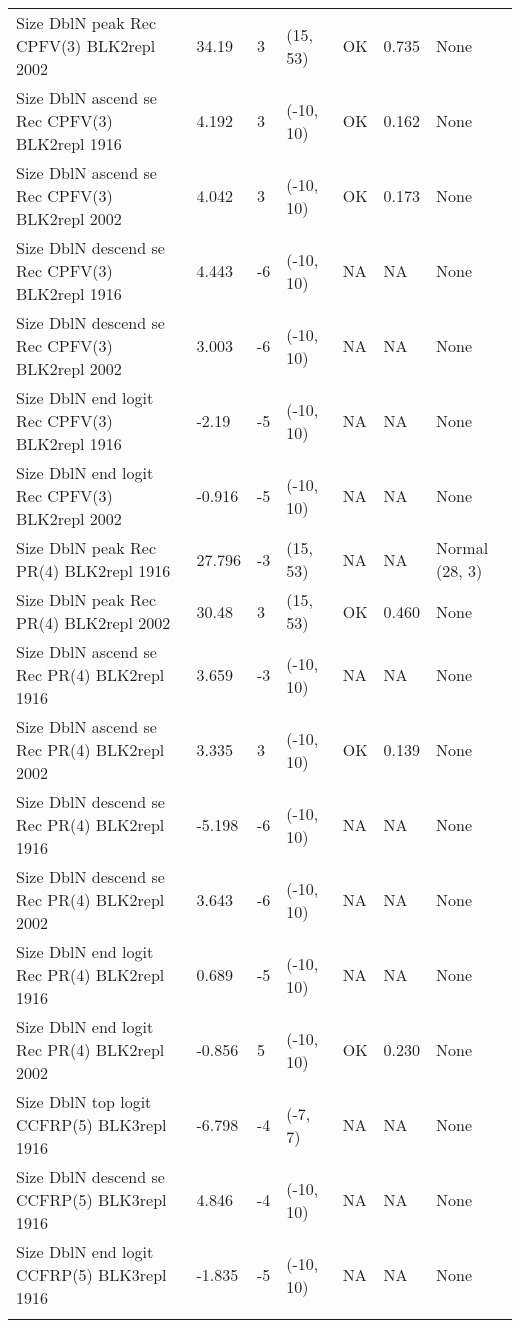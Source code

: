 \documentclass[11pt,
  letterpaper,
]{article}
\begin{document}
\begin{landscape}
\begin{longtable}[t]{>{\raggedright\arraybackslash}p{7.5cm}lllll>{\raggedright\arraybackslash}p{3.5cm}}
Size DblN peak Rec CPFV(3) BLK2repl 2002 & 34.19 & 3 & (15, 53) & OK & 0.735 & None\\
Size DblN ascend se Rec CPFV(3) BLK2repl 1916 & 4.192 & 3 & (-10, 10) & OK & 0.162 & None\\
Size DblN ascend se Rec CPFV(3) BLK2repl 2002 & 4.042 & 3 & (-10, 10) & OK & 0.173 & None\\
Size DblN descend se Rec CPFV(3) BLK2repl 1916 & 4.443 & -6 & (-10, 10) & NA & NA & None\\
Size DblN descend se Rec CPFV(3) BLK2repl 2002 & 3.003 & -6 & (-10, 10) & NA & NA & None\\
Size DblN end logit Rec CPFV(3) BLK2repl 1916 & -2.19 & -5 & (-10, 10) & NA & NA & None\\
Size DblN end logit Rec CPFV(3) BLK2repl 2002 & -0.916 & -5 & (-10, 10) & NA & NA & None\\
Size DblN peak Rec PR(4) BLK2repl 1916 & 27.796 & -3 & (15, 53) & NA & NA & Normal (28, 3)\\
Size DblN peak Rec PR(4) BLK2repl 2002 & 30.48 & 3 & (15, 53) & OK & 0.460 & None\\
Size DblN ascend se Rec PR(4) BLK2repl 1916 & 3.659 & -3 & (-10, 10) & NA & NA & None\\
Size DblN ascend se Rec PR(4) BLK2repl 2002 & 3.335 & 3 & (-10, 10) & OK & 0.139 & None\\
Size DblN descend se Rec PR(4) BLK2repl 1916 & -5.198 & -6 & (-10, 10) & NA & NA & None\\
Size DblN descend se Rec PR(4) BLK2repl 2002 & 3.643 & -6 & (-10, 10) & NA & NA & None\\
Size DblN end logit Rec PR(4) BLK2repl 1916 & 0.689 & -5 & (-10, 10) & NA & NA & None\\
Size DblN end logit Rec PR(4) BLK2repl 2002 & -0.856 & 5 & (-10, 10) & OK & 0.230 & None\\
Size DblN top logit CCFRP(5) BLK3repl 1916 & -6.798 & -4 & (-7, 7) & NA & NA & None\\
Size DblN descend se CCFRP(5) BLK3repl 1916 & 4.846 & -4 & (-10, 10) & NA & NA & None\\
Size DblN end logit CCFRP(5) BLK3repl 1916 & -1.835 & -5 & (-10, 10) & NA & NA & None\\*
\end{longtable}
\endgroup{}
\end{landscape}
\endgroup{}

\newpage


\end{document}
